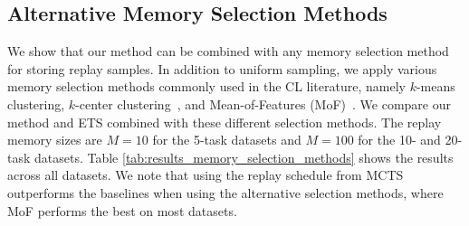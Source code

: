 %
\subsection{Alternative Memory Selection Methods}
\label{paperC:sec:alternative_memory_selection_methods}

We show that our method can be combined with any memory selection method for storing replay samples. In addition to uniform sampling, we apply various memory selection methods commonly used in the CL literature, namely $k$-means clustering, $k$-center clustering~, and Mean-of-Features (MoF)~. We compare our method and ETS combined with these different selection methods. 
The replay memory sizes are $M=10$ for the 5-task datasets and $M=100$ for the 10- and 20-task datasets.  
Table \ref{tab:results_memory_selection_methods} shows the results across all datasets. 
We note that using the replay schedule from MCTS outperforms the baselines when using the alternative selection methods, where MoF performs the best on most datasets. 


%
\begin{comment}
\begin{figure}[t]
	\centering
	\setlength{\figwidth}{0.35\textwidth}
	\setlength{\figheight}{.16\textheight}%
	
	\vspace{-3mm}
	\caption{Average test accuracies over tasks after learning the final task (ACC) over different replay memory sizes $M$ for the MCTS (Ours) and the Random, ETS, and Heuristic baselines on all datasets.
		All results have been averaged over 5 seeds. The results show that replay scheduling can outperform replaying with random and ETS schedules, %
		especially for small $M$, on both small and large datasets across different backbone choices. Furthermore, our method requires less careful tuning than the Heuristic baseline as $M$ increases.
	}
	\vspace{-3mm}
	\label{fig:acc_over_replay_memory_size}
\end{figure}

\end{comment}


